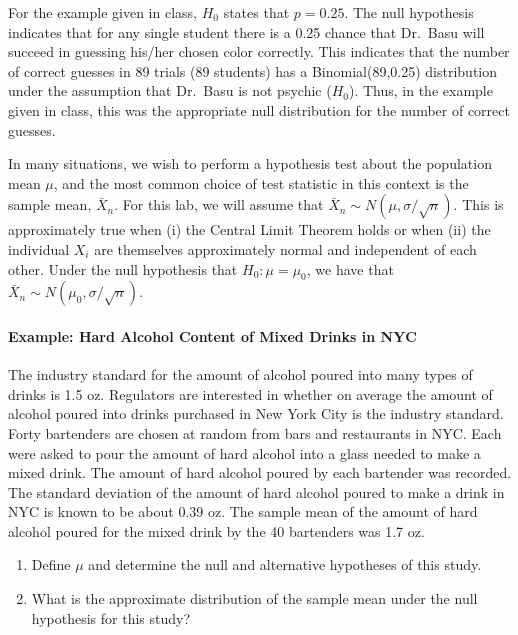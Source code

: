 \documentclass[]{article}
\let\oldparagraph\paragraph
\renewcommand{\paragraph}[1]{\oldparagraph{#1}\mbox{}}
\begin{document}
For the example given in class, \(H_0\) states that \(p = 0.25\). The
null hypothesis indicates that for any single student there is a 0.25
chance that Dr.~Basu will succeed in guessing his/her chosen color
correctly. This indicates that the number of correct guesses in 89
trials (89 students) has a Binomial(89,0.25) distribution under the
assumption that Dr.~Basu is not psychic (\(H_0\)). Thus, in the example
given in class, this was the appropriate null distribution for the
number of correct guesses.

In many situations, we wish to perform a hypothesis test about the
population mean \(\mu\), and the most common choice of test statistic in
this context is the sample mean, \(\bar X_n\). For this lab, we will
assume that \(\bar X_n \sim N(\mu, \sigma/\sqrt{n})\). This is
approximately true when (i) the Central Limit Theorem holds or when (ii)
the individual \(X_i\) are themselves approximately normal and
independent of each other. Under the null hypothesis that
\(H_0:\mu=\mu_0\), we have that
\(\bar X_n \sim N(\mu_0, \sigma/\sqrt{n})\).

\hypertarget{example-hard-alcohol-content-of-mixed-drinks-in-nyc}{%
\paragraph{Example: Hard Alcohol Content of Mixed Drinks in
NYC}\label{example-hard-alcohol-content-of-mixed-drinks-in-nyc}}

The industry standard for the amount of alcohol poured into many types
of drinks is 1.5 oz. Regulators are interested in whether on average the
amount of alcohol poured into drinks purchased in New York City is the
industry standard. Forty bartenders are chosen at random from bars and
restaurants in NYC. Each were asked to pour the amount of hard alcohol
into a glass needed to make a mixed drink. The amount of hard alcohol
poured by each bartender was recorded. The standard deviation of the
amount of hard alcohol poured to make a drink in NYC is known to be
about 0.39 oz. The sample mean of the amount of hard alcohol poured for
the mixed drink by the 40 bartenders was 1.7 oz.

\begin{enumerate}
\def\labelenumi{\alph{enumi})}
\item
  Define \(\mu\) and determine the null and alternative hypotheses of
  this study.
\item
  What is the approximate distribution of the sample mean under the null
  hypothesis for this study?
\end{enumerate}
\end{document}
